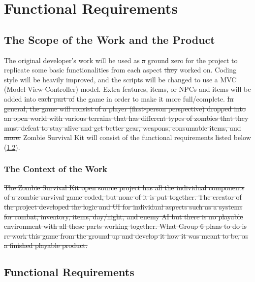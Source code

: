 \documentclass[12pt, titlepage]{article}
\begin{document}
\section{Functional Requirements} 

\subsection{The Scope of the Work and the Product}
The original developer’s work will be used as \sout{a} ground zero for the project to replicate some basic functionalities from each aspect \sout{they} worked on. Coding style will be heavily improved, and the scripts will be changed to use a MVC (Model-View-Controller) model. Extra features, \sout{items, or NPCs} {\color{magenta} and items} will be added into \sout{each part of} the game in order to make it more full/complete. \sout{In general, the game will consist of a player (first-person perspective) dropped into an open world with various terrains that has different types of zombies that they must defeat to stay alive and get better gear, weapons, consumable items, and more.}
 {\color{magenta} Zombie Survival Kit will consist of the functional requirements listed below (\ref{Functional Requirements}).}

\subsubsection{The Context of the Work}
\sout{The Zombie Survival Kit open source project has all the individual components of a zombie survival game coded, but none of it is put together. The creator of the project developed the logic and UI for individual aspects such as a systems for combat, inventory, items, day/night, and enemy AI but there is no playable environment with all these parts working together. What Group 6 plans to do is re-work this game from the ground up and develop it how it was meant to be, as a finished playable product.}
 


\subsection{Functional Requirements} \label{Functional Requirements}
\end{document}
